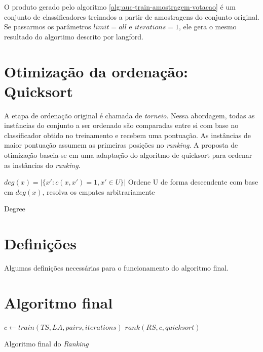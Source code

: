 O produto gerado pelo algoritmo \ref{alg:auc-train-amostragem-votacao} é um conjunto de classificadores treinados a partir de amostragens do conjunto original. Se passarmos os parâmetros $limit=all$ e $iterations=1$, ele gera o mesmo resultado do algortimo descrito por {{langford}}.


\section{Otimização da ordenação: Quicksort}
A etapa de ordenação original é chamada de \emph{torneio}. Nessa abordagem, todas as instâncias do conjunto a ser ordenado são comparadas entre si com base no classificador obtido no treinamento e recebem uma pontuação. As instâncias de maior pontuação assumem as primeiras posições no \emph{ranking}. A proposta de otimização baseia-se em uma adaptação do algoritmo de quicksort para ordenar as instâncias do \emph{ranking}.

\begin{algorithm}
\begin{algorithmic}

\STATE $deg(x) = |\{x': c(x, x')=1, x'\in U\}|$
\ENDFOR
\STATE Ordene U de forma descendente com base em $deg(x)$, resolva os empates arbitrariamente

\caption{Degree}
\label{alg:degree}

\end{algorithmic}
\end{algorithm}


\section{Definições}
Algumas definições necessárias para o funcionamento do algoritmo final.

\section{Algoritmo final}

\begin{algorithm}
\begin{algorithmic}

\STATE $c \gets train(TS, LA, pairs, iterations)$
\STATE $rank(RS, c, quicksort)$

\caption{Algoritmo final do \emph{Ranking}}
\label{alg:ranking}

\end{algorithmic}
\end{algorithm}
